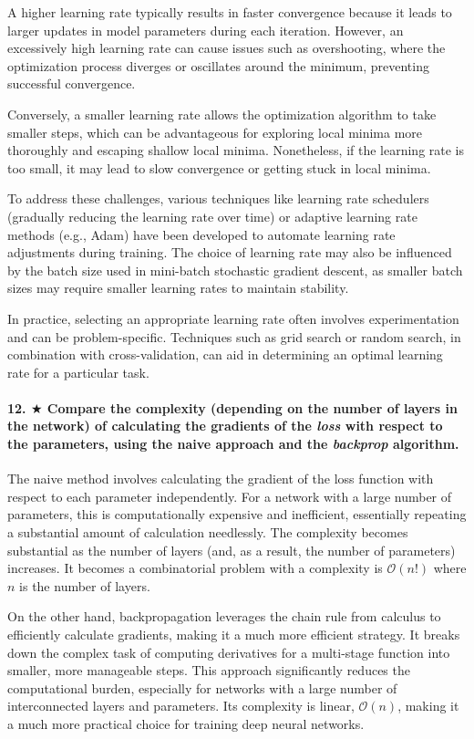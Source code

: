A higher learning rate typically results in faster convergence because it leads to larger updates in model parameters during each iteration. However, an excessively high learning rate can cause issues such as overshooting, where the optimization process diverges or oscillates around the minimum, preventing successful convergence.

Conversely, a smaller learning rate allows the optimization algorithm to take smaller steps, which can be advantageous for exploring local minima more thoroughly and escaping shallow local minima. Nonetheless, if the learning rate is too small, it may lead to slow convergence or getting stuck in local minima.

To address these challenges, various techniques like learning rate schedulers (gradually reducing the learning rate over time) or adaptive learning rate methods (e.g., Adam) have been developed to automate learning rate adjustments during training. The choice of learning rate may also be influenced by the batch size used in mini-batch stochastic gradient descent, as smaller batch sizes may require smaller learning rates to maintain stability.

In practice, selecting an appropriate learning rate often involves experimentation and can be problem-specific. Techniques such as grid search or random search, in combination with cross-validation, can aid in determining an optimal learning rate for a particular task.

\paragraph{12. $\bigstar$ Compare the complexity (depending on the number of layers in the network) of calculating the gradients of the \textit{loss} with respect to the parameters, using the naive approach and the \textit{backprop} algorithm.}
The naive method involves calculating the gradient of the loss function with respect to each parameter independently. For a network with a large number of parameters, this is computationally expensive and inefficient, essentially repeating a substantial amount of calculation needlessly. The complexity becomes substantial as the number of layers (and, as a result, the number of parameters) increases. It becomes a combinatorial problem with a complexity is $ \mathcal{O}(n!) $ where $n$ is the number of layers.

On the other hand, backpropagation leverages the chain rule from calculus to efficiently calculate gradients, making it a much more efficient strategy. It breaks down the complex task of computing derivatives for a multi-stage function into smaller, more manageable steps. This approach significantly reduces the computational burden, especially for networks with a large number of interconnected layers and parameters. Its complexity is linear, $\mathcal{O}(n)$, making it a much more practical choice for training deep neural networks.

